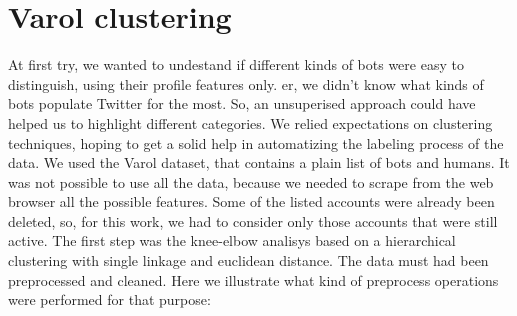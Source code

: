\section{Varol clustering}
At first try, we wanted to undestand if different kinds of bots were easy to distinguish, using their profile features only. er, we didn't know what kinds of bots populate Twitter for the most. So, an unsuperised approach could have helped us to highlight different categories. We relied expectations on clustering techniques, hoping to get a solid help in automatizing the labeling process of the data.
We used the Varol dataset\cite{Varol}, that contains a plain list of bots and humans.
It was not possible to use all the data, because we needed to scrape from the web browser all the possible features. Some of the listed accounts were already been deleted, so, for this work, we had to consider only those accounts that were still active.
The first step was the knee-elbow analisys based on a hierarchical clustering with single linkage and euclidean distance. The data must had been preprocessed and cleaned.
Here we illustrate what kind of preprocess operations were performed for that purpose:

